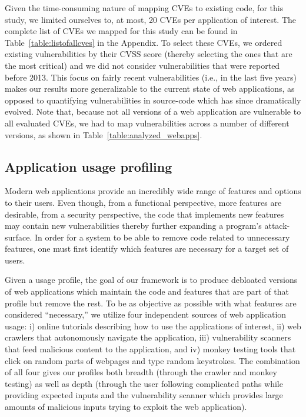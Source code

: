 Given the time-consuming nature of mapping CVEs to existing code, for
this study, we limited ourselves to, at most, 20 CVEs per application
of interest.
The complete list of CVEs we mapped for this study can be found in
Table~\ref{table:listofallcves} in the Appendix.
To select these CVEs, we ordered existing vulnerabilities by
their CVSS score (thereby selecting the ones that are the most critical)
and we did not consider vulnerabilities that were reported before 2013. This
focus on fairly recent vulnerabilities (i.e., in the last five years) makes
our results more generalizable to the current state of web applications,
as opposed to quantifying vulnerabilities in source-code which has since
dramatically evolved. Note that, because not all versions of a web application
are vulnerable to all evaluated CVEs, we had to map vulnerabilities
across a number of different versions, as shown in
Table~\ref{table:analyzed_webapps}.



\subsection{Application usage profiling}
\label{subsec:profiling}

Modern web applications provide an incredibly wide range of features and
options to their users. Even though, from a functional perspective, more
features are desirable, from a security perspective, the code that implements
new features may contain new vulnerabilities thereby further expanding
a program's attack-surface. In order for a system to be
able to remove code related to unnecessary features, one must first identify
which features are necessary for a target set of users.

Given a usage profile, the goal of our framework is to produce debloated
versions of web applications which maintain the code and features that are
part of that profile but remove the rest. To be as objective as possible with
what features are considered ``necessary,'' we utilize four independent
sources of web application usage: i) online tutorials describing how to use
the applications of interest, ii) web crawlers that autonomously navigate
the application, iii) vulnerability scanners that feed malicious content to the
application, and iv) monkey testing tools that click on random parts of webpages
and type random keystrokes. The combination of all four gives our profiles
both breadth (through the crawler and monkey testing) as well as depth (through
the user following complicated paths while providing expected inputs and the
vulnerability scanner which provides large amounts of malicious inputs trying
to exploit the web application).

